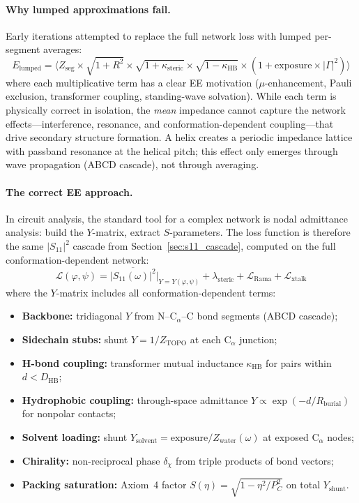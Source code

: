 \paragraph{Why lumped approximations fail.}
Early iterations attempted to replace the full network loss with lumped per-segment averages:
\begin{equation}
    E_\text{lumped} = \bigl\langle Z_\text{seg} \times \sqrt{1+R^2} \times \sqrt{1+\kappa_\text{steric}} \times \sqrt{1-\kappa_\text{HB}} \times (1 + \text{exposure} \times |\Gamma|^2) \bigr\rangle
    \label{eq:lumped_failed}
\end{equation}
where each multiplicative term has a clear EE motivation ($\mu$-enhancement, Pauli exclusion, transformer coupling, standing-wave solvation).  While each term is physically correct in isolation, the \emph{mean} impedance cannot capture the network effects---interference, resonance, and conformation-dependent coupling---that drive secondary structure formation.  A helix creates a periodic impedance lattice with passband resonance at the helical pitch; this effect only emerges through wave propagation (ABCD cascade), not through averaging.

\paragraph{The correct EE approach.}
In circuit analysis, the standard tool for a complex network is nodal admittance analysis: build the $Y$-matrix, extract $S$-parameters.  The loss function is therefore the same $|S_{11}|^2$ cascade from Section~\ref{sec:s11_cascade}, computed on the full conformation-dependent network:
\begin{equation}
    \mathcal{L}(\varphi, \psi) = \overline{|S_{11}(\omega)|^2}\big|_{Y = Y(\varphi,\psi)}
    + \lambda_\text{steric} + \mathcal{L}_\text{Rama} + \mathcal{L}_\text{xtalk}
    \label{eq:v7_loss}
\end{equation}
where the $Y$-matrix includes all conformation-dependent terms:
\begin{itemize}
    \item \textbf{Backbone:} tridiagonal $Y$ from N--C$_\alpha$--C bond segments (ABCD cascade);
    \item \textbf{Sidechain stubs:} shunt $Y = 1/Z_\text{TOPO}$ at each C$_\alpha$ junction;
    \item \textbf{H-bond coupling:} transformer mutual inductance $\kappa_\text{HB}$ for pairs within $d < D_\text{HB}$;
    \item \textbf{Hydrophobic coupling:} through-space admittance $Y \propto \exp(-d/R_\text{burial})$ for nonpolar contacts;
    \item \textbf{Solvent loading:} shunt $Y_\text{solvent} = \text{exposure}/Z_\text{water}(\omega)$ at exposed C$_\alpha$ nodes;
    \item \textbf{Chirality:} non-reciprocal phase $\delta_\chi$ from triple products of bond vectors;
    \item \textbf{Packing saturation:} Axiom~4 factor $S(\eta) = \sqrt{1 - \eta^2/P_C^2}$ on total $Y_\text{shunt}$.
\end{itemize}

